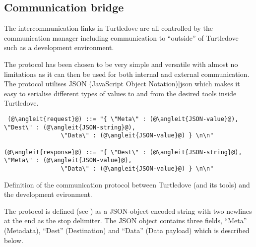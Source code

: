 \subsection{Communication bridge}

The intercommunication links in Turtledove are all controlled by the
communication manager including communication to ``outside'' of Turtledove such
as a development environment. 

\def \protocoljson {\fref[plain]{fig:protocol-json}}

The protocol has been chosen to be very simple and versatile with almost no
limitations as it can then be used for both internal and external
communication. The protocol utilises JSON (JavaScript Object
Notation)\cite[\protocoljson]{json} which makes it easy to serialise different types of values
to and from the desired tools inside Turtledove.


\begin{nonfloatingfigure}
{ %
  \newcommand{\angleit}[1]{$\langle$\textnormal{\textit{#1}}$\rangle$}
\begin{lstlisting}
 (@\angleit{request}@) ::= "{ \"Meta\" : (@\angleit{JSON-value}@), \"Dest\" : (@\angleit{JSON-string}@),
                \"Data\" : (@\angleit{JSON-value}@) } \n\n"

(@\angleit{response}@) ::= "{ \"Dest\" : (@\angleit{JSON-string}@), \"Meta\" : (@\angleit{JSON-value}@),
                \"Data\" : (@\angleit{JSON-value}@) } \n\n"
\end{lstlisting}    
}
  
  \caption{Definition of the communication protocol between Turtledove (and its
    tools) and the development evironment.}
  \label{fig:intercom-protocol-def}
\end{nonfloatingfigure}


The protocol is defined (see ) as a JSON-object
encoded string with two newlines at the end as the stop delimiter. The JSON
object contains three fields, ``Meta'' (Metadata), ``Dest'' (Destination) and
``Data'' (Data payload) which is described below.

